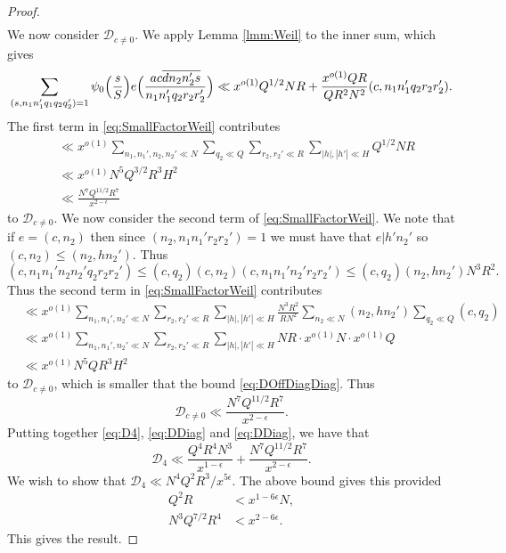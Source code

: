 \documentclass[10pt]{amsart}
\theoremstyle{plain}
\numberwithin{equation}{section}
\begin{document}
\begin{proof}
\begin{align}
\end{align}
We now consider $\mathscr{D}_{c\ne 0}$. We apply Lemma \ref{lmm:Weil} to the inner sum, which gives
\begin{equation}
\sum_{(s,n_1n_1'q_1q_2q_2')=1}\psi_0\Bigl(\frac{s}{S}\Bigr)e\Bigl(\frac{a c\overline{d n_2n_2' s}}{n_1n_1'q_2 r_2r_2'}\Bigr)\ll x^{o(1)}Q^{1/2}N R+\frac{x^{o(1)} Q R}{Q R^2 N^2}(c,n_1n_1'q_2r_2r_2').
\label{eq:SmallFactorWeil}
\end{equation}
The first term in \eqref{eq:SmallFactorWeil} contributes
\begin{align}
&\ll x^{o(1)}\sum_{n_1,n_1',n_2,n_2'\ll N}\sum_{q_2\ll Q}\sum_{r_2,r_2'\ll R}\sum_{|h|,|h'|\ll H}Q^{1/2} N R\nonumber \\
&\ll x^{o(1)} N^5 Q^{3/2} R^3 H^2\nonumber\\
&\ll \frac{N^7 Q^{11/2}R^7}{x^{2-\epsilon}}\label{eq:DOffDiagDiag}
\end{align}
to $\mathscr{D}_{c\ne 0}$. We now consider the second term of  \eqref{eq:SmallFactorWeil}. We note that if $e=(c,n_2)$ then since $(n_2,n_1n_1'r_2r_2')=1$ we must have that $e|h' n_2'$ so $(c,n_2)\le (n_2,h n_2')$. Thus
\[
(c,n_1n_1'n_2n_2'q_2r_2r_2')\le (c,q_2)(c,n_2)(c,n_1n_1'n_2'r_2r_2')\le (c,q_2)(n_2,h n_2')N^3R^2.
\]
Thus the second term in \eqref{eq:SmallFactorWeil} contributes
\begin{align*}
&\ll x^{o(1)}\sum_{n_1,n_1',n_2'\ll N}\sum_{r_2,r_2'\ll R}\sum_{|h|,|h'|\ll H}\frac{N^3 R^2}{R N^2}\sum_{n_2\ll N}(n_2,h n_2')\sum_{q_2\ll Q}(c,q_2)\\
&\ll  x^{o(1)}\sum_{n_1,n_1',n_2'\ll N}\sum_{r_2,r_2'\ll R}\sum_{|h|,|h'|\ll H}NR\cdot x^{o(1)}N\cdot x^{o(1)}Q\\
&\ll x^{o(1)}N^5 Q R^3 H^2
\end{align*}
to $\mathscr{D}_{c\ne 0}$, which is smaller that the bound \eqref{eq:DOffDiagDiag}. Thus
\begin{equation}
\mathscr{D}_{c\ne 0}\ll  \frac{N^7 Q^{11/2}R^7}{x^{2-\epsilon}}.\label{eq:DOffDiag}
\end{equation}
Putting together \eqref{eq:D4}, \eqref{eq:DDiag} and \eqref{eq:DDiag}, we have that
\[
\mathscr{D}_4\ll \frac{Q^4 R^4 N^3}{x^{1-\epsilon}}+\frac{N^7 Q^{11/2}R^7}{x^{2-\epsilon}}.
\]
We wish to show that $\mathscr{D}_4\ll N^4Q^2R^3/x^{5\epsilon}$. The above bound gives this provided
\begin{align}
Q^2R&< x^{1-6\epsilon}N,\\
N^3Q^{7/2}R^4&<x^{2-6\epsilon}.
\end{align}
This gives the result.
\end{proof}
\end{document}

